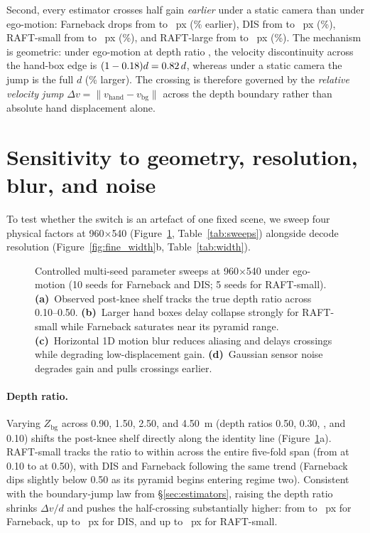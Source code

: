 \documentclass[11pt]{article}
\begin{document}
Second, every estimator crosses half gain \emph{earlier} under a static camera than under
ego-motion: Farneback drops from \cgWidthHalfB{} to \cgStaticHalfFar{}~px (\cgShiftPctFar{}\%
earlier), DIS from \cgHalfDisMean{} to \cgStaticHalfDis{}~px (\cgShiftPctDis{}\%), RAFT-small from
\cgHalfRaftMean{} to \cgStaticHalfRaftS{}~px (\cgShiftPctRaftS{}\%), and RAFT-large from
\cgHalfRaftLargeMean{} to \cgStaticHalfRaftL{}~px (\cgShiftPctRaftL{}\%). The mechanism is
geometric: under ego-motion at depth ratio \cgRatio{}, the velocity discontinuity across the
hand-box edge is $(1 - 0.18{})d = 0.82{}\,d$, whereas under a static camera the jump
is the full $d$ (\cgJumpRatioPct{}\% larger). The crossing is therefore governed by the
\emph{relative velocity jump} $\Delta v = \|v_{\mathrm{hand}} - v_{\mathrm{bg}}\|$ across the depth
boundary rather than absolute hand displacement alone.

\section{Sensitivity to geometry, resolution, blur, and noise}
\label{sec:sweeps}

To test whether the switch is an artefact of one fixed scene, we sweep four physical factors at
960$\times$540 (Figure~\ref{fig:sweeps}, Table~\ref{tab:sweeps}) alongside decode resolution
(Figure~\ref{fig:fine_width}b, Table~\ref{tab:width}).

\begin{figure}[t]
\centering

\caption{Controlled multi-seed parameter sweeps at 960$\times$540 under ego-motion (10 seeds for
Farneback and DIS; 5 seeds for RAFT-small). \textbf{(a)}~Observed post-knee shelf tracks the true
depth ratio across 0.10--0.50. \textbf{(b)}~Larger hand boxes delay collapse strongly for
RAFT-small while Farneback saturates near its pyramid range. \textbf{(c)}~Horizontal 1D motion blur
reduces aliasing and delays crossings while degrading low-displacement gain. \textbf{(d)}~Gaussian
sensor noise degrades gain and pulls crossings earlier.}
\label{fig:sweeps}
\end{figure}

\paragraph{Depth ratio.}
Varying $Z_{\mathrm{bg}}$ across 0.90, 1.50, 2.50, and 4.50~m (depth ratios 0.50, 0.30, \cgRatio{},
and 0.10) shifts the post-knee shelf directly along the identity line (Figure~\ref{fig:sweeps}a).
RAFT-small tracks the ratio to within \cgDepthMaxErr{} across the entire five-fold span (from
\cgDepthShelfRaftTen{} at 0.10 to \cgDepthShelfRaftFifty{} at 0.50), with DIS and Farneback
following the same trend (Farneback dips slightly below 0.50 as its pyramid begins entering regime
two). Consistent with the boundary-jump law from \S\ref{sec:estimators}, raising the depth ratio
shrinks $\Delta v / d$ and pushes the half-crossing substantially higher: from \cgDepthHalfFarTen{}
to \cgDepthHalfFarFifty{}~px for Farneback, up to \cgDepthHalfDisFifty{}~px for DIS, and up to
\cgDepthHalfRaftFifty{}~px for RAFT-small.
\end{document}
